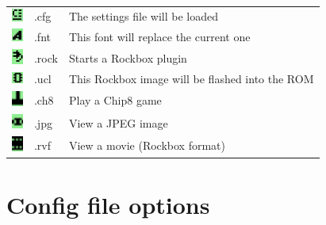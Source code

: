 \begin{center}
\begin{tabularx}{\textwidth}{llX}
\includegraphics[width=0.37cm]{appendix/images/icon-config.png} 
  & .cfg & The settings file will be loaded\\
\includegraphics[width=0.37cm]{appendix/images/icon-font.png} 
  & .fnt & This font will replace the current one\\
\includegraphics[width=0.37cm]{appendix/images/icon-rock.png} 
  & .rock & Starts a Rockbox plugin\\
\includegraphics[width=0.37cm]{appendix/images/icon-ucl.png} 
  & .ucl & This Rockbox image will be flashed into the ROM \\
\includegraphics[width=0.37cm]{appendix/images/icon-chip8.png} 
  & .ch8 & Play a Chip8 game \\
\includegraphics[width=0.37cm]{appendix/images/icon-image-file.png} 
  & .jpg & View a JPEG image \\
\includegraphics[width=0.37cm]{appendix/images/icon-movie-file.png} 
  & .rvf & View a movie (Rockbox format)\\\bottomrule
\end{tabularx}
\end{center}



\chapter{\label{ref:config_file_options}Config file options}


